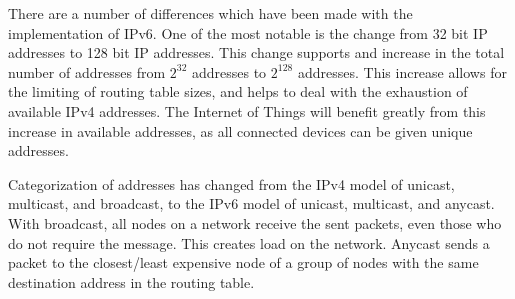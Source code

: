 There are a number of differences which have been made with the implementation
of IPv6. One of the most notable is the change from 32 bit IP addresses to 128
bit IP addresses. This change supports and increase in the total number of
addresses from $2^{32}$ addresses to  $2^{128}$ addresses\cite{v4v6}. This increase allows
for the limiting of routing table sizes, and helps to deal with the exhaustion
of available IPv4 addresses\cite{ietftools}. The Internet of Things will benefit
greatly from
this increase in available addresses, as all connected devices can be given
unique addresses.

Categorization of addresses has changed from the IPv4 model of unicast,
multicast, and broadcast, to the IPv6 model of unicast, multicast, and anycast.
With broadcast, all nodes on a network receive the sent packets, even those who
do not require the message. This creates load on the network. Anycast sends a
packet to the closest/least expensive node of a group of nodes with the same
destination address in the routing table\cite{ipcisco}.
